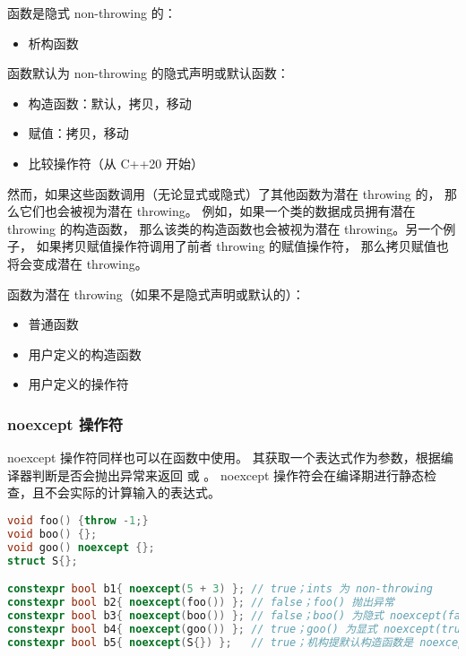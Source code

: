 \documentclass[../../LearnCpp.tex]{subfiles}
\begin{document}
函数是隐式 non-throwing 的：

\begin{itemize}
  \item 析构函数
\end{itemize}

函数默认为 non-throwing 的隐式声明或默认函数：

\begin{itemize}
  \item 构造函数：默认，拷贝，移动
  \item 赋值：拷贝，移动
  \item 比较操作符（从 C++20 开始）
\end{itemize}

然而，如果这些函数调用（无论显式或隐式）了其他函数为潜在 throwing 的，
那么它们也会被视为潜在 throwing。
例如，如果一个类的数据成员拥有潜在 throwing 的构造函数，
那么该类的构造函数也会被视为潜在 throwing。另一个例子，
如果拷贝赋值操作符调用了前者 throwing 的赋值操作符，
那么拷贝赋值也将会变成潜在 throwing。

函数为潜在 throwing（如果不是隐式声明或默认的）：

\begin{itemize}
  \item 普通函数
  \item 用户定义的构造函数
  \item 用户定义的操作符
\end{itemize}

\subsubsection*{noexcept 操作符}

noexcept 操作符同样也可以在函数中使用。
其获取一个表达式作为参数，根据编译器判断是否会抛出异常来返回  或 。
noexcept 操作符会在编译期进行静态检查，且不会实际的计算输入的表达式。

\begin{lstlisting}[language=C++]
void foo() {throw -1;}
void boo() {};
void goo() noexcept {};
struct S{};

constexpr bool b1{ noexcept(5 + 3) }; // true；ints 为 non-throwing
constexpr bool b2{ noexcept(foo()) }; // false；foo() 抛出异常
constexpr bool b3{ noexcept(boo()) }; // false；boo() 为隐式 noexcept(false)
constexpr bool b4{ noexcept(goo()) }; // true；goo() 为显式 noexcept(true)
constexpr bool b5{ noexcept(S{}) };   // true；机构提默认构造函数是 noexcept
\end{lstlisting}
\end{document}
